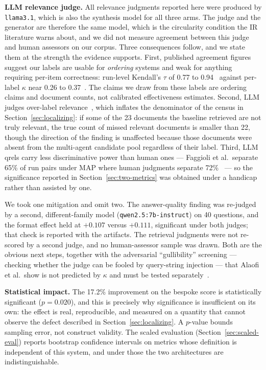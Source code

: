 \documentclass[acmsmall,review,anonymous,screen]{acmart}
\begin{document}
\textbf{LLM relevance judge.}
All relevance judgments reported here were produced by \texttt{llama3.1}, which
is also the synthesis model for all three arms. The judge and the generator are
therefore the same model, which is the circularity condition the IR literature
warns about, and we did not measure agreement between this judge and human
assessors on our corpus. Three consequences follow, and we state them at the
strength the evidence supports. First, published agreement figures suggest our
labels are usable for \emph{ordering} systems and weak for anything requiring
per-item correctness: run-level Kendall's $\tau$ of 0.77 to
0.94~\cite{upadhyay2024umbrela,thomas2024preferences} against per-label
$\kappa$ near 0.26 to 0.37~\cite{upadhyay2024umbrela,faggioli2023perspectives}.
The claims we draw from these labels are ordering claims and document counts,
not calibrated effectiveness estimates. Second, LLM judges over-label
relevance~\cite{alaofi2024fooled}, which inflates the denominator of the
census in Section~\ref{sec:localizing}: if some of the 23 documents the baseline
retrieved are not truly relevant, the true count of missed relevant documents is
smaller than 22, though the direction of the finding is unaffected because those
documents were absent from the multi-agent candidate pool regardless of their
label. Third, LLM qrels carry less discriminative power than human ones ---
Faggioli et al.\ separate 65\% of run pairs under MAP where human judgments
separate 72\%~\cite{faggioli2023perspectives} --- so the significance reported
in Section~\ref{sec:two-metrics} was obtained under a handicap rather than
assisted by one.

We took one mitigation and omit two. The answer-quality finding was re-judged by
a second, different-family model (\texttt{qwen2.5:7b-instruct}) on 40 questions,
and the format effect held at $+0.107$ versus $+0.111$, significant under both
judges; that check is reported with the artifacts. The retrieval judgments were
not re-scored by a second judge, and no human-assessor sample was drawn. Both
are the obvious next steps, together with the adversarial ``gullibility''
screening --- checking whether the judge can be fooled by query-string
injection --- that Alaofi et al.\ show is not predicted by $\kappa$ and must be
tested separately~\cite{alaofi2024fooled}.

\textbf{Statistical impact.}
The 17.2\% improvement on the bespoke score is statistically significant
($p=0.020$), and this is precisely why significance is insufficient on its own:
the effect is real, reproducible, and measured on a quantity that cannot observe
the defect described in Section~\ref{sec:localizing}. A $p$-value bounds
sampling error, not construct validity. The scaled evaluation
(Section~\ref{sec:scaled-eval}) reports bootstrap confidence intervals on
metrics whose definition is independent of this system, and under those the two
architectures are indistinguishable.
\end{document}
